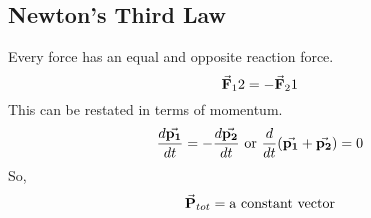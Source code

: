     \subsection*{Newton's Third Law}
        Every force has an equal and opposite reaction force.
        \begin{equation*}
            \va{F}_12 = -\va{F}_21
        \end{equation*}
        This can be restated in terms of momentum.
        \begin{equation*}
            \frac{d\va{p_1}}{dt} = -\frac{d\va{p_2}}{dt} \text{ or } \frac{d}{dt} (\va{p_1} + \va{p_2}) = 0
        \end{equation*}
        So,
        \begin{equation*}
            \va{P}_{tot} = \text{a constant vector}
        \end{equation*}